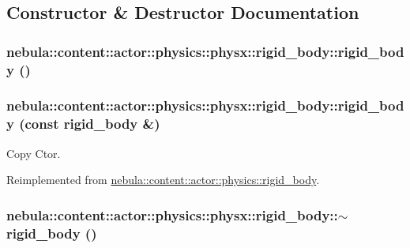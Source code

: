 \subsection{Constructor \& Destructor Documentation}
\hypertarget{classnebula_1_1content_1_1actor_1_1physics_1_1physx_1_1rigid__body_ae323aeac0f44b1721fb19dbdbe59cd4c}{
\subsubsection[{rigid\_\-body}]{\setlength{\rightskip}{0pt plus 5cm}nebula::content::actor::physics::physx::rigid\_\-body::rigid\_\-body ()}}
\label{classnebula_1_1content_1_1actor_1_1physics_1_1physx_1_1rigid__body_ae323aeac0f44b1721fb19dbdbe59cd4c}
\hypertarget{classnebula_1_1content_1_1actor_1_1physics_1_1physx_1_1rigid__body_a009ca3e1ac9652c731ab5099da54e758}{
\subsubsection[{rigid\_\-body}]{\setlength{\rightskip}{0pt plus 5cm}nebula::content::actor::physics::physx::rigid\_\-body::rigid\_\-body (const {\bf rigid\_\-body} \&)}}
\label{classnebula_1_1content_1_1actor_1_1physics_1_1physx_1_1rigid__body_a009ca3e1ac9652c731ab5099da54e758}


Copy Ctor. 

Reimplemented from \hyperlink{classnebula_1_1content_1_1actor_1_1physics_1_1rigid__body_ac507978a93f6acbf1d81f41cffbc1c04}{nebula::content::actor::physics::rigid\_\-body}.\hypertarget{classnebula_1_1content_1_1actor_1_1physics_1_1physx_1_1rigid__body_afe378b6377be61afa0caf48180175c01}{
\subsubsection[{$\sim$rigid\_\-body}]{\setlength{\rightskip}{0pt plus 5cm}nebula::content::actor::physics::physx::rigid\_\-body::$\sim$rigid\_\-body ()}}
\label{classnebula_1_1content_1_1actor_1_1physics_1_1physx_1_1rigid__body_afe378b6377be61afa0caf48180175c01}


